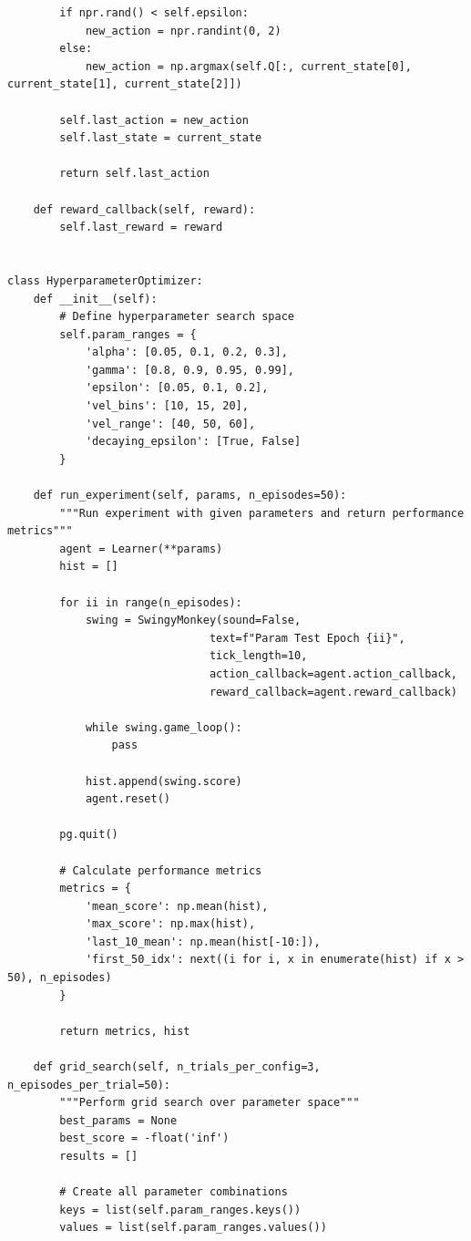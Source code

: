 \documentclass[submit]{../harvardml}
\begin{document}
\begin{lstlisting}
        if npr.rand() < self.epsilon:
            new_action = npr.randint(0, 2)
        else:
            new_action = np.argmax(self.Q[:, current_state[0], current_state[1], current_state[2]])
        
        self.last_action = new_action
        self.last_state = current_state
        
        return self.last_action
    
    def reward_callback(self, reward):
        self.last_reward = reward


class HyperparameterOptimizer:
    def __init__(self):
        # Define hyperparameter search space
        self.param_ranges = {
            'alpha': [0.05, 0.1, 0.2, 0.3],
            'gamma': [0.8, 0.9, 0.95, 0.99],
            'epsilon': [0.05, 0.1, 0.2],
            'vel_bins': [10, 15, 20],
            'vel_range': [40, 50, 60],
            'decaying_epsilon': [True, False]
        }
    
    def run_experiment(self, params, n_episodes=50):
        """Run experiment with given parameters and return performance metrics"""
        agent = Learner(**params)
        hist = []
        
        for ii in range(n_episodes):
            swing = SwingyMonkey(sound=False,
                               text=f"Param Test Epoch {ii}",
                               tick_length=10,
                               action_callback=agent.action_callback,
                               reward_callback=agent.reward_callback)
            
            while swing.game_loop():
                pass
            
            hist.append(swing.score)
            agent.reset()
        
        pg.quit()
        
        # Calculate performance metrics
        metrics = {
            'mean_score': np.mean(hist),
            'max_score': np.max(hist),
            'last_10_mean': np.mean(hist[-10:]),
            'first_50_idx': next((i for i, x in enumerate(hist) if x > 50), n_episodes)
        }
        
        return metrics, hist
    
    def grid_search(self, n_trials_per_config=3, n_episodes_per_trial=50):
        """Perform grid search over parameter space"""
        best_params = None
        best_score = -float('inf')
        results = []
        
        # Create all parameter combinations
        keys = list(self.param_ranges.keys())
        values = list(self.param_ranges.values())
        

\end{lstlisting}
\end{document}
